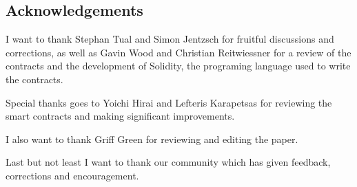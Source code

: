 \documentclass[9pt,oneside]{amsart}
\begin{document}
\begin{multicols}{2}
\section{Acknowledgements}
I want to thank Stephan Tual and Simon Jentzsch for fruitful discussions and corrections, as well as Gavin Wood and Christian Reitwiessner for a review of the contracts and the development of Solidity, the programing language used to write the contracts.

Special thanks goes to Yoichi Hirai and Lefteris Karapetsas for reviewing the smart contracts and making significant improvements.

I also want to thank Griff Green for reviewing and editing the paper.

Last but not least I want to thank our community which has given feedback, corrections and encouragement.


\end{multicols}
\end{document}
